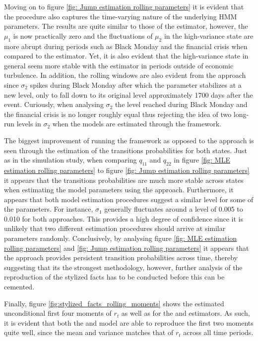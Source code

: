 Moving on to figure \ref{fig: Jump estimation rolling parameters} it is evident that the \jump procedure also captures the time-varying nature of the underlying HMM parameters. The results are quite similar to those of the \mle estimator, however, the $\mu_1$ is now practically zero and the fluctuations of $\mu_2$ in the high-variance state are more abrupt during periods such as Black Monday and the financial crisis when compared to the \mle estimator. Yet, it is also evident that the high-variance state in general seem more stable with the \jump estimator in periods outside of economic turbulence. In addition, the rolling windows are also evident from the \jump approach since $\sigma_2$ spikes during Black Monday after which the parameter stabilizes at a new level, only to fall down to its original level approximately 1700 days after the event. Curiously, when analysing $\sigma_2$ the level reached during Black Monday and the financial crisis is no longer roughly equal thus rejecting the idea of two long-run levels in $\sigma_2$ when the models are estimated through the \jump framework. 

The biggest improvement of running the \jump framework as opposed to the \mle approach is seen through the estimation of the transitions probabilities for both states. Just as in the simulation study, when comparing $q_{11}$ and $q_{22}$ in figure \ref{fig: MLE estimation rolling parameters} to figure \ref{fig: Jump estimation rolling parameters} it appears that the transitions probabilities are much more stable across states when estimating the model parameters using the \jump approach. Furthermore, it appears that both model estimation procedures suggest a similar level for some of the parameters. For instance, $\sigma_1$ generally fluctuates around a level of 0.005 to 0.010 for both approaches. This provides a high degree of confidence since it is unlikely that two different estimation procedures should arrive at similar parameters randomly. Conclusively, by analysing figure \ref{fig: MLE estimation rolling parameters} and \ref{fig: Jump estimation rolling parameters} it appears that the \jump approach provides persistent transition probabilities across time, thereby suggesting that its the strongest methodology, however, further analysis of the reproduction of the stylized facts has to be conducted before this can be cemented.

Finally, figure \ref{fig:stylized_facts_rolling_moments} shows the estimated unconditional first four moments of $r_t$ as well as for the \jump and \mle estimators. As such, it is evident that both the \mle and \jump model are able to reproduce the first two moments quite well, since the mean and variance matches that of $r_t$ across all time periods.

